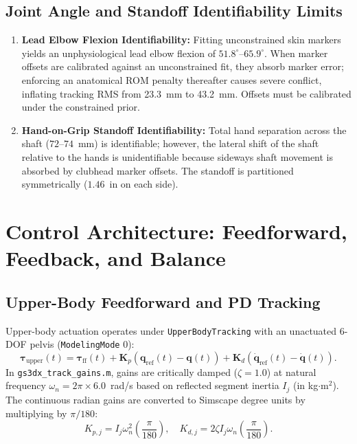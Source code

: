 \documentclass[11pt,a4paper]{article}
\begin{document}
\subsection{Joint Angle and Standoff Identifiability Limits}
\begin{enumerate}
    \item \textbf{Lead Elbow Flexion Identifiability:} Fitting unconstrained skin markers yields an unphysiological lead elbow flexion of $51.8^\circ$--$65.9^\circ$. When marker offsets are calibrated against an unconstrained fit, they absorb marker error; enforcing an anatomical ROM penalty thereafter causes severe conflict, inflating tracking RMS from 23.3~mm to 43.2~mm. Offsets must be calibrated under the constrained prior.
    \item \textbf{Hand-on-Grip Standoff Identifiability:} Total hand separation across the shaft ($72$--$74$~mm) is identifiable; however, the lateral shift of the shaft relative to the hands is unidentifiable because sideways shaft movement is absorbed by clubhead marker offsets. The standoff is partitioned symmetrically ($1.46$~in on each side).
\end{enumerate}

\section{Control Architecture: Feedforward, Feedback, and Balance}

\subsection{Upper-Body Feedforward and PD Tracking}
Upper-body actuation operates under \texttt{UpperBodyTracking} with an unactuated 6-DOF pelvis (\texttt{ModelingMode} 0):
\begin{equation}
    \boldsymbol{\tau}_{\text{upper}}(t) = \boldsymbol{\tau}_{\text{ff}}(t) + \mathbf{K}_p (\mathbf{q}_{\text{ref}}(t) - \mathbf{q}(t)) + \mathbf{K}_d (\dot{\mathbf{q}}_{\text{ref}}(t) - \dot{\mathbf{q}}(t)).
\end{equation}
In \texttt{gs3dx\_track\_gains.m}, gains are critically damped ($\zeta = 1.0$) at natural frequency $\omega_n = 2\pi \times 6.0$~rad/s based on reflected segment inertia $I_j$ (in kg$\cdot$m$^2$). The continuous radian gains are converted to Simscape degree units by multiplying by $\pi / 180$:
\begin{equation}
    K_{p, j} = I_j \omega_n^2 \left(\frac{\pi}{180}\right), \quad K_{d, j} = 2 \zeta I_j \omega_n \left(\frac{\pi}{180}\right).
\end{equation}
\end{document}
